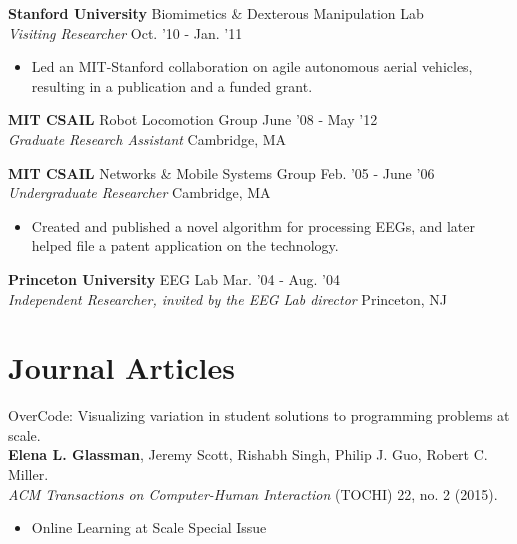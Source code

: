 \documentclass[margin]{res}
\begin{document}
\begin{resume}
{\bf Stanford University} Biomimetics \& Dexterous Manipulation Lab \\ {\it Visiting Researcher}  \hfill Oct. '10 - Jan. '11 
 \begin{itemize} \itemsep -2pt  %
\item Led an MIT-Stanford collaboration on agile autonomous aerial vehicles, resulting in a publication and a funded grant.
 \end{itemize}

{\bf MIT CSAIL} Robot Locomotion Group \hfill June '08 - May '12 \\  {\it Graduate Research Assistant} \hfill Cambridge, MA 
 
% 
{\bf MIT CSAIL} Networks \& Mobile Systems Group \hfill Feb. '05 - June '06 \\{\it Undergraduate Researcher}  \hfill Cambridge, MA 
 \begin{itemize} \itemsep -2pt  %
\item Created and published a novel algorithm for processing EEGs, and later helped file a patent application on the technology.
\end{itemize}


{\bf Princeton University} EEG Lab \hfill Mar. '04 - Aug. '04 \\ {\it Independent Researcher, invited by the EEG Lab director} \hfill Princeton, NJ 
 
 
\section{Journal Articles}

OverCode: Visualizing variation in student solutions to programming problems at scale.\\
{\bf Elena L. Glassman}, Jeremy Scott, Rishabh Singh, Philip J. Guo, Robert C. Miller. \\ 
{\it ACM Transactions on Computer-Human Interaction} (TOCHI) 22, no. 2 (2015).
\begin{itemize} \itemsep -2pt 
\item Online Learning at Scale Special Issue
\end{itemize}


\end{resume}
\end{document}
